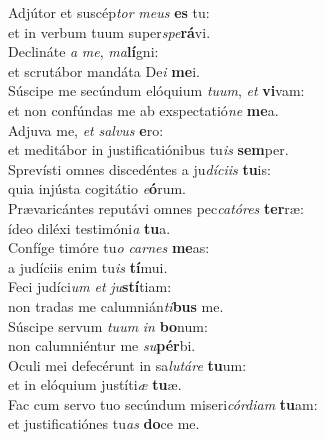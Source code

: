 \evenverse Adjútor et suscép\textit{tor} \textit{me}\textit{us} \textbf{es} tu:~\*\\
\evenverse et in verbum tuum super\textit{spe}\textbf{rá}vi.\\
\oddverse Declináte \textit{a} \textit{me}, \textit{ma}\textbf{lí}gni:~\*\\
\oddverse et scrutábor mandáta De\textit{i} \textbf{me}i.\\
\evenverse Súscipe me secúndum elóquium \textit{tu}\textit{um}, \textit{et} \textbf{vi}vam:~\*\\
\evenverse et non confúndas me ab exspectatió\textit{ne} \textbf{me}a.\\
\oddverse Adjuva me, \textit{et} \textit{sal}\textit{vus} \textbf{e}ro:~\*\\
\oddverse et meditábor in justificatiónibus tu\textit{is} \textbf{sem}per.\\
\evenverse Sprevísti omnes discedéntes a ju\textit{dí}\textit{ci}\textit{is} \textbf{tu}is:~\*\\
\evenverse quia injústa cogitátio \textit{e}\textbf{ó}rum.\\
\oddverse Prævaricántes reputávi omnes pec\textit{ca}\textit{tó}\textit{res} \textbf{ter}ræ:~\*\\
\oddverse ídeo diléxi testimóni\textit{a} \textbf{tu}a.\\
\evenverse Confíge timóre tu\textit{o} \textit{car}\textit{nes} \textbf{me}as:~\*\\
\evenverse a judíciis enim tu\textit{is} \textbf{tí}mui.\\
\oddverse Feci judíci\textit{um} \textit{et} \textit{ju}\textbf{stí}tiam:~\*\\
\oddverse non tradas me calumnián\textit{ti}\textbf{bus} me.\\
\evenverse Súscipe servum \textit{tu}\textit{um} \textit{in} \textbf{bo}num:~\*\\
\evenverse non calumniéntur me \textit{su}\textbf{pér}bi.\\
\oddverse Oculi mei defecérunt in sa\textit{lu}\textit{tá}\textit{re} \textbf{tu}um:~\*\\
\oddverse et in elóquium justíti\textit{æ} \textbf{tu}æ.\\
\evenverse Fac cum servo tuo secúndum miseri\textit{cór}\textit{di}\textit{am} \textbf{tu}am:~\*\\
\evenverse et justificatiónes tu\textit{as} \textbf{do}ce me.\\
